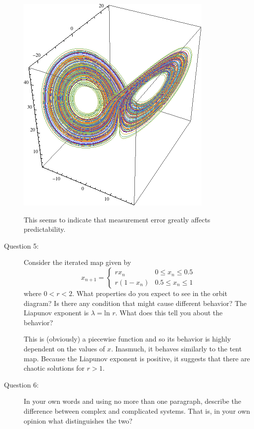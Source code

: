 \documentclass[letterpaper,10pt]{article}
\begin{document}
\begin{description}
\begin{center}
  \includegraphics[scale=0.5]{images/lorenz6.png}
\end{center}
This seems to indicate that measurement error greatly affects predictability.

\item[Question 5:]
Consider the iterated map given by
\[x_{n+1} = \left\{
  \begin{array}{lr}
    rx_n &  0\le x_n \le 0.5 \\
    r(1-x_n) &  0.5\le x_n \le 1
  \end{array}
\right.
\]
where $0<r<2$.  What properties do you expect to see in the orbit diagram?  Is there any condition that might cause different behavior?  The Liapunov exponent is $\lambda=\mbox{ln\ }r$. What does this tell you about the behavior?


This is (obviously) a piecewise function and so its behavior is highly dependent on the values of $x$.  Inasmuch, it behaves similarly to the tent map.  Because the Liapunov exponent is positive, it suggests that there are chaotic solutions for $r>1$.

\item[Question 6:]
  In your own words and using no more than one paragraph, describe the difference between complex and complicated systems.  That is, in your own opinion what distinguishes the two?


\end{description}
\end{document}
